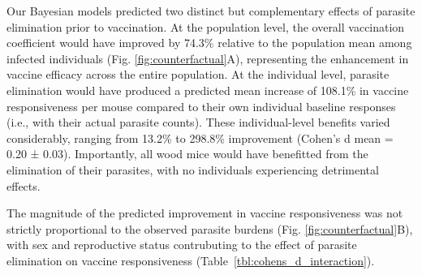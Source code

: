 \documentclass[a4paper, hidelinks, 11pt]{article}
\begin{document}
Our Bayesian models predicted two distinct but complementary effects of parasite elimination prior to vaccination. At the population level, the overall vaccination coefficient would have improved by 74.3\% relative to the population mean among infected individuals (Fig. \ref{fig:counterfactual}A), representing the enhancement in vaccine efficacy across the entire population. At the individual level, parasite elimination would have produced a predicted mean increase of 108.1\% in vaccine responsiveness per mouse compared to their own individual baseline responses (i.e., with their actual parasite counts). These individual-level benefits varied considerably, ranging from 13.2\% to 298.8\% improvement (Cohen's d mean = 0.20 ± 0.03). Importantly, all wood mice would have benefitted from the elimination of their parasites, with no individuals experiencing detrimental effects.

The magnitude of the predicted improvement in vaccine responsiveness was not strictly proportional to the observed parasite burdens (Fig. \ref{fig:counterfactual}B), with sex and reproductive status contrubuting to the effect of parasite elimination on vaccine responsiveness (Table~\ref{tbl:cohens_d_interaction}).
\end{document}
